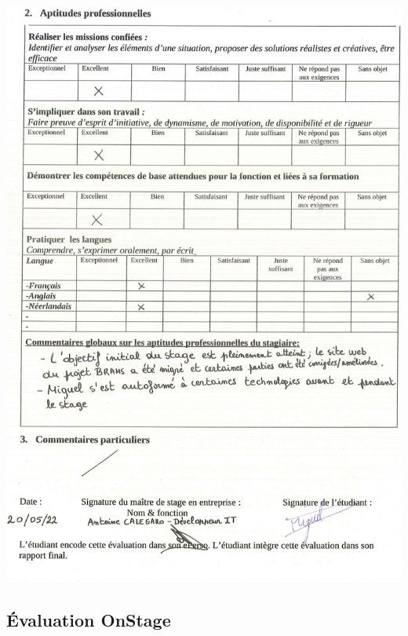\documentclass[11pt]{article}
\begin{document}
\includegraphics[scale=0.38]{Screenshot from 2022-05-22 20-51-56.png}

\newpage

\subsection{Évaluation OnStage}
\end{document}
